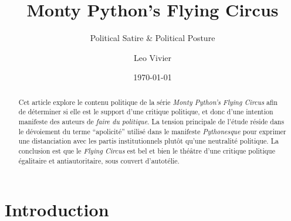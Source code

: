\documentclass[
,a4paper
,DIV=12
,12pt
,abstract
,bibliography=totoc
]{scrartcl}
\author{Leo Vivier}
\date{\today}
\title{Monty Python's Flying Circus}
\subtitle{Political Satire \& Political Posture}
\begin{document}

\maketitle

\begin{abstract}
  Cet article explore le contenu politique de la série \emph{Monty Python’s Flying Circus} afin de déterminer si elle est le support d’une critique politique, et donc d’une intention manifeste des auteurs de \emph{faire du politique}.  La tension principale de l’étude réside dans le dévoiement du terme \enquote{apolicité} utilisé dans le manifeste \emph{Pythonesque} pour exprimer une distanciation avec les partis institutionnels plutôt qu’une neutralité politique.  La conclusion est que le \emph{Flying Circus} est bel et bien le théâtre d’une critique politique égalitaire et antiautoritaire, sous couvert d’autotélie.
\end{abstract}



\tableofcontents
\clearpage


\section*{Introduction}
\label{sec:proposal}
\end{document}
